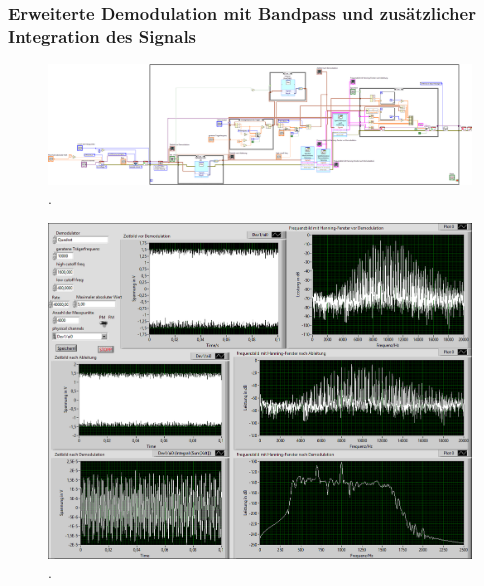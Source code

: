 \documentclass[
a4paper,
12pt,
pagesize,
ngerman
]{scrartcl}
\begin{document}
	\subsubsection{Erweiterte Demodulation mit Bandpass und zusätzlicher Integration des Signals}
	
	\begin{figure}[H]
		\centering
		\includegraphics[width=1.0\textwidth]{EIRE2018Dateien/Tag4/OsziFMPM-Demod/mitBandpassUndIntegrationBilder/OsziPlusFMPMd}
		\caption{.}
	\end{figure}

	\begin{figure}[H]
		\centering
		\includegraphics[width=1.0\textwidth]{EIRE2018Dateien/Tag4/OsziFMPM-Demod/mitBandpassUndIntegrationBilder/OsziPlusFMPMp}
		\caption{.}
	\end{figure}

	
	\printbibliography
\end{document}
